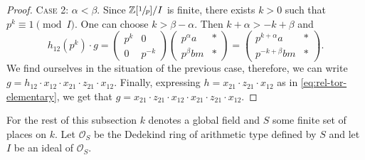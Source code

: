\documentclass[11pt]{amsart}
\theoremstyle{plain}
\numberwithin{equation}{section}
\numberwithin{lemma}{section}
\theoremstyle{definition}
\theoremstyle{remark}
\begin{document}
\begin{proof}
\textsc{Case 2:} $\alpha<\beta$. 
Since $\mathbb{Z}[\sfrac{1}{p}]/I$ is finite, there exists $k>0$ such that $p^k\equiv 1\pmod I$.
One can choose $k>\beta-\alpha$.
Then $k+\alpha>-k+\beta$ and
\[ h_{12}\left(p^k\right)\cdot g =
\begin{pmatrix} p^k & 0 \\ 0 & p^{-k} \end{pmatrix}
\begin{pmatrix} p^\alpha a & * \\ p^\beta bm & * \end{pmatrix}=
\begin{pmatrix} p^{k+\alpha} a & * \\ p^{-k+\beta} bm & * \end{pmatrix}. \]
We find ourselves in the situation of the previous case, therefore, we can write $g=h_{12}\cdot x_{12} \cdot x_{21} \cdot z_{21} \cdot x_{12}$.
Finally, expressing $h=x_{21}\cdot z_{21}\cdot x_{12}$ as in \eqref{eq:rel-tor-elementary}, we get that $g=x_{21} \cdot z_{21} \cdot x_{12} \cdot x_{21} \cdot z_{21} \cdot x_{12}$.
\end{proof}

For the rest of this subsection $k$ denotes a global field and $S$ some finite set of places on $k$. 
Let $\mathcal{O}_S$ be the Dedekind ring of arithmetic type defined by $S$ and let $I$ be an ideal of $\mathcal{O}_S$.
\end{document}
